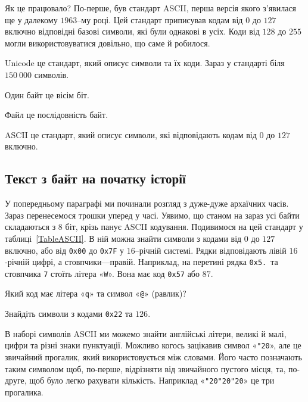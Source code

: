 \documentclass{book}
\newcommand{\hexstr}[1]{{\tt 0x#1}}
\newcommand{\chr}[1]{«\texttt{#1}»}
\newcommand{\s}{\char"20}
\newcommand{\chspace}{\chr\s}
\begin{document}
Як це працювало?
По-перше, був стандарт ASCII, перша версія якого з'явилася ще у далекому $1963$--му році.
Цей стандарт приписував кодам від $0$ до $127$ включно відповідні базові символи, які були однакові в усіх.
Коди від $128$ до $255$ могли використовуватися довільно, що саме й робилося.

\begin{summary}
\item Unicode це стандарт, який описує символи та їх коди. Зараз у стандарті біля $150~000$ символів.
\item Один байт це вісім біт.
\item Файл це послідовність байт.
\item ASCII це стандарт, який описує символи, які відповідають кодам від $0$ до $127$ включно.
\end{summary}

\subsection{Текст з байт на початку історії}

У попередньому параграфі ми починали розгляд з дуже-дуже архаїчних часів.
Зараз перенесемося трошки уперед у часі.
Уявимо, що станом на зараз усі байти складаються з $8$ біт, крізь панує ASCII кодування.
Подивимося на цей стандарт у таблиці~\ref{TableASCII}.
В ній можна знайти символи з кодами від $0$ до $127$ включно, або від \hexstr{00} до \hexstr{7F} у $16$--річній системі.
Рядки відповідають лівій $16$-річній цифрі, а стовпчики---правій.
Наприклад, на перетині рядка \hexstr{5.}\ та стовпчика \texttt{7} стоїть літера \chr W.
Вона має код \hexstr{57} або $87$.



\begin{exercise}
Який код має літера \chr q та символ \chr @ (равлик)?
\end{exercise}

\begin{exercise}
Знайдіть символи з кодами \hexstr{22} та $126$.
\end{exercise}

В наборі символів ASCII ми можемо знайти англійські літери, великі й малі, цифри та різні знаки пунктуації.
Можливо когось зацікавив символ \chspace, але це звичайний прогалик, який використовується між словами.
Його часто позначають таким символом щоб, по-перше, відрізняти від звичайного пустого місця, та, по-друге, щоб було легко рахувати кількість.
Наприклад «\texttt{\s\s\s}» це три прогалика.
\end{document}
